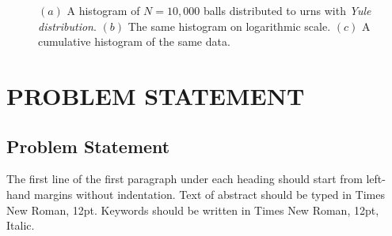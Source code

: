 \documentclass[a4paper, 12pt]{report}
\begin{document}
\begin{figure}[ht]
\centering
    \hspace{0.5cm}
    \hspace{0.5cm}
    \label{fig:1}
    \caption[Yule process histograms]{
        $(a)$ A histogram of $N=10,000$ balls distributed to urns with \textit{Yule distribution}.
        $(b)$ The same histogram on logarithmic scale.
        $(c)$ A cumulative histogram of the same data.
    }
\end{figure}

\pagebreak
\chapter{PROBLEM  STATEMENT}

\section{Problem Statement}
\par The first line of the first paragraph under each heading should start from left-hand margins without indentation.  Text of abstract should be typed in Times New Roman, 12pt. Keywords should be written in Times New Roman, 12pt, Italic.
\end{document}

